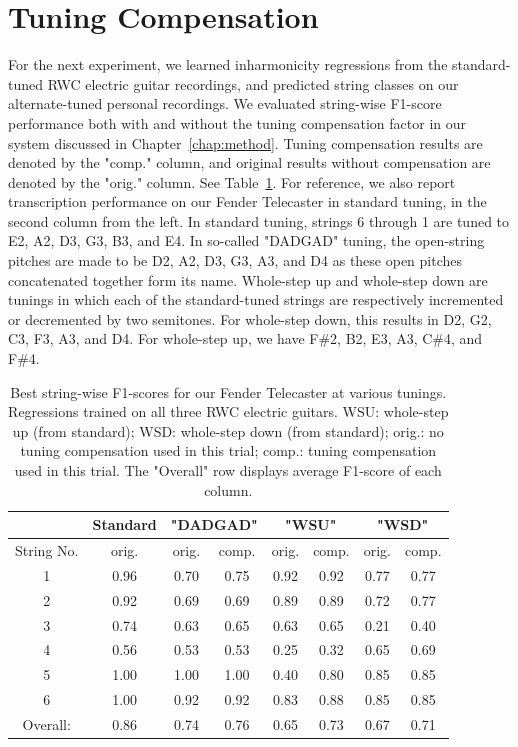 \documentclass[12pt]{cmuthesis}
\begin{document}
\section{Tuning Compensation}
For the next experiment, we learned inharmonicity regressions from the standard-tuned RWC electric guitar recordings, and predicted string classes on our alternate-tuned personal recordings. We evaluated string-wise F1-score performance both with and without the tuning compensation factor in our system discussed in Chapter~\ref{chap:method}. Tuning compensation results are denoted by the "comp." column, and original results without compensation are denoted by the "orig." column. See Table~\ref{tab:resultsTune}. For reference, we also report transcription performance on our Fender Telecaster in standard tuning, in the second column from the left. In standard tuning, strings 6 through 1 are tuned to E2, A2, D3, G3, B3, and E4. In so-called "DADGAD" tuning, the open-string pitches are made to be D2, A2, D3, G3, A3, and D4 as these open pitches concatenated together form its name. Whole-step up and whole-step down are tunings in which each of the standard-tuned strings are respectively incremented or decremented by two semitones. For whole-step down, this results in D2, G2, C3, F3, A3, and D4. For whole-step up, we have F\#2, B2, E3, A3, C\#4, and F\#4.

\begin{table}[!htbp]
\begin{center}
\begin{tabular}{||c||c||c|c||c|c||c|c||}
\hline
& Standard & \multicolumn{2}{|c|}{"DADGAD"} & \multicolumn{2}{|c|}{"WSU"} & \multicolumn{2}{|c|}{"WSD"} \\
\hline
String No. & orig. & orig. & comp. & orig. & comp. & orig. & comp. \\
\hline
1 & 0.96 & 0.70 & 0.75 & 0.92 & 0.92 & 0.77 & 0.77 \\
\hline
2 & 0.92 & 0.69 & 0.69 & 0.89 & 0.89 & 0.72 & 0.77\\
\hline
3 & 0.74 & 0.63 & 0.65 & 0.63 & 0.65 & 0.21 & 0.40\\
\hline
4 & 0.56 & 0.53 & 0.53 & 0.25 & 0.32 & 0.65 & 0.69 \\
\hline
5 & 1.00 & 1.00 & 1.00 & 0.40 & 0.80 & 0.85 & 0.85 \\
\hline
6 & 1.00 & 0.92 & 0.92 & 0.83 & 0.88 & 0.85 & 0.85\\ 
\hline
\hline
Overall: & 0.86 & 0.74 & 0.76 & 0.65 & 0.73 & 0.67 & 0.71\\
\hline
\end{tabular}
\caption{Best string-wise F1-scores for our Fender Telecaster at various tunings. Regressions trained on all three RWC electric guitars. WSU: whole-step up (from standard); WSD: whole-step down (from standard); orig.: no tuning compensation used in this trial; comp.: tuning compensation used in this trial. The "Overall" row displays average F1-score of each column.} 
\label{tab:resultsTune}
\end{center}
\end{table}
\end{document}
